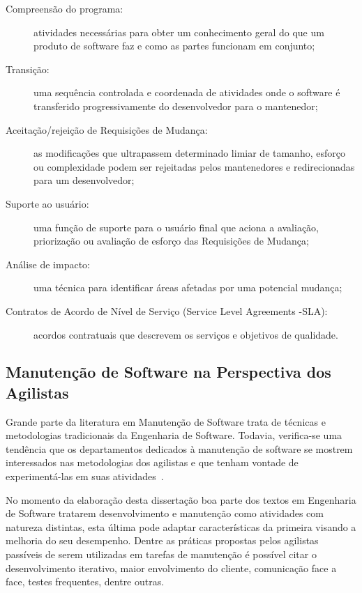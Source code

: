 \begin{description}
	\item[Compreensão do programa:] atividades necessárias para obter um
		conhecimento geral do que um produto de software faz e como as partes
		funcionam em conjunto;
	\item[Transição:] uma sequência controlada e coordenada de atividades onde o
		software é transferido progressivamente do desenvolvedor para o
		mantenedor;
	\item[Aceitação/rejeição de Requisições de Mudança:] as modificações
		que ultrapassem determinado limiar de tamanho, esforço ou complexidade
		podem ser rejeitadas pelos mantenedores e redirecionadas para um
		desenvolvedor;
	\item[Suporte ao usuário:] uma função de suporte para o usuário final que
		aciona a avaliação, priorização ou avaliação de esforço das Requisições
		de Mudança;
	\item[Análise de impacto:] uma técnica para identificar áreas afetadas por
		uma potencial mudança;
	\item[Contratos de Acordo de Nível de Serviço (Service Level Agreements
		\@-\@ SLA):] acordos contratuais que descrevem os serviços e objetivos
		de qualidade.
\end{description}

\subsection{Manutenção de Software na Perspectiva dos Agilistas}
\label{sub:manutenção_de_software_com_método_dos_agilistas}

Grande parte da literatura em Manutenção de Software trata de técnicas e
metodologias tradicionais da Engenharia de Software. Todavia, verifica-se uma
tendência que os departamentos dedicados à manutenção de software se mostrem
interessados nas metodologias dos agilistas e que tenham vontade de
experimentá-las em suas atividades~\cite{Heeager2015}.

No momento da elaboração desta dissertação boa parte dos textos em Engenharia de
Software tratarem desenvolvimento e manutenção como atividades com natureza
distintas, esta última pode adaptar características da primeira visando a
melhoria do seu desempenho. Dentre as práticas propostas pelos agilistas
passíveis de serem utilizadas em tarefas de manutenção é possível citar o
desenvolvimento iterativo, maior envolvimento do cliente, comunicação face a
face, testes frequentes, dentre outras.

